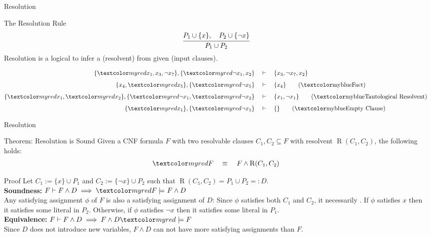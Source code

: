 \documentclass[t]{sdqbeamer}
\begin{document}
\begin{frame}{Resolution}
\begin{block}{The Resolution Rule}
\vspace*{-3ex}
\begin{align*}
	\cfrac{P_1 \cup \{x\},\quad P_2 \cup \{\lnot x\}}{P_1 \cup P_2}
\end{align*}
Resolution is a logical  to infer a  (resolvent) from given  (input clauses).
\end{block}
	
\begin{example}[Resolution]
\vspace*{-3ex}
\begin{align*}
	\{ \highlo{x_1}, x_3, \lnot {x_7} \}, \{ \highlo{\lnot {x_1}}, x_2 \} \quad &\vdash \quad \{ x_3, \lnot {x_7}, x_2 \} \\[1ex]
	\{ x_4, \highlo{x_5} \}, \{ \highlo{\lnot {x_5}} \} \quad &\vdash \quad \{ x_4 \} \tag{\highl{Fact}}\\[1ex]
	\{ \highlo{x_1}, \highlo{x_2} \}, \{ \highlo{\lnot {x_1}, \highlo{\lnot {x_2}}} \} \quad &\vdash \quad \{ x_1, \lnot {x_1} \} \tag{\highl{Tautological Resolvent}} \\[1ex]
	\{ \highlo{x_1} \}, \{ \highlo{\lnot {x_1}} \} \quad &\vdash \quad \{ \} \tag{\highl{Empty Clause}}
\end{align*}
\end{example}
\end{frame}
	
\begin{frame}{Resolution}
\begin{block}{Theorem: Resolution is Sound}
Given a CNF formula $F$ with two resolvable clauses $C_1, C_2 \subseteq F$ with resolvent $\operatorname{R}(C_1,C_2)$, the following holds:
\vspace*{-1ex}
\begin{align*}
	\highlo{F \quad \equiv~} \quad F \land \operatorname{R}(C_1,C_2)
\end{align*}
\end{block}
	
\begin{block}{Proof}
Let $C_1 := \{ x \} \cup P_1$ and $C_2 := \{ \lnot x \} \cup P_2$ such that $\operatorname{R}(C_1,C_2) = P_1 \cup P_2 =: D$.\\[1ex]

\textbf{Soundness:} $F \vdash F \land D \implies \highlo{F \models~} F \land D$ \\[.5ex]
Any satisfying assignment $\phi$ of $F$ is also a satisfying assignment of $D$:
Since $\phi$ satisfies both $C_1$ and $C_2$, it necessarily . If $\phi$ satisfies $x$ then it satisfies some literal in $P_2$. Otherwise, if $\phi$ satisfies $\lnot x$ then it satisfies some literal in $P_1$.\\[1ex]
\pause
\textbf{Equivalence:} $F \vdash F \land D \implies F \land D \highlo{~\models F}$ \\[.5ex]
Since $D$ does not introduce new variables, $F \wedge D$ can not have more satisfying assignments than $F$.
\end{block}
\end{frame}
	
\end{document}
